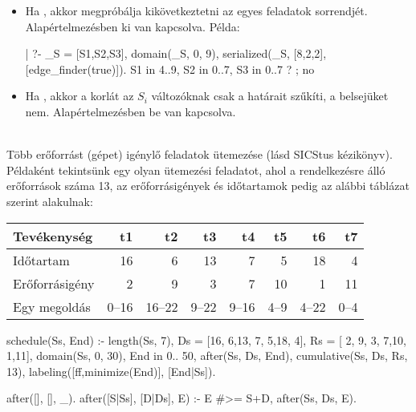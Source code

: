 \begin{itemize}
\item {}
          Ha  , akkor megpróbálja kikövetkeztetni az egyes
          feladatok sorrendjét. Alapértelmezésben ki van kapcsolva. Példa:
\begin{prologcode}
| ?- _S = [S1,S2,S3], domain(_S, 0, 9),
      serialized(_S, [8,2,2], [edge_finder(true)]).
S1 in 4..9, S2 in 0..7, S3 in 0..7 ? ;
no
\end{prologcode}

\item {}
          Ha  , akkor a korlát az $S_i$ változóknak
          csak a határait szűkíti, a belsejüket nem. Alapértelmezésben be van kapcsolva.

\end{itemize}

\medskip

{} \\
Több erőforrást (gépet) igénylő feladatok ütemezése (lásd SICStus kézikönyv).
\br
Példaként tekintsünk egy olyan ütemezési feladatot, ahol a rendelkezésre álló
erőforrások száma 13, az erőforrásigények és időtartamok pedig az alábbi táblázat
szerint alakulnak:

\begin{center}
\begin{tabular}{|l|r|r|r|r|r|r|r|}
\hline
Tevékenység               & t1   & t2    & t3   & t4   & t5   & t6   & t7 \\
\hline
Időtartam                 & 16   & 6     & 13   & 7    & 5    & 18   & 4 \\
Erőforrásigény            & 2    & 9     & 3    & 7    &10    & 1    &11\\
\hline
\hline
Egy megoldás              &0--16 &16--22 &9--22 &9--16 &4--9  &4--22 &0--4\\
\hline
\end{tabular}
\end{center}

\begin{prologcode}
schedule(Ss, End) :-
        length(Ss, 7),
        Ds = [16, 6,13, 7, 5,18, 4],
        Rs = [ 2, 9, 3, 7,10, 1,11],
        domain(Ss, 0, 30),
        End in 0.. 50,
        after(Ss, Ds, End),
        cumulative(Ss, Ds, Rs, 13),
        labeling([ff,minimize(End)], [End|Ss]).

after([], [], _).
after([S|Ss], [D|Ds], E) :- E #>= S+D, after(Ss, Ds, E).
\end{prologcode}

